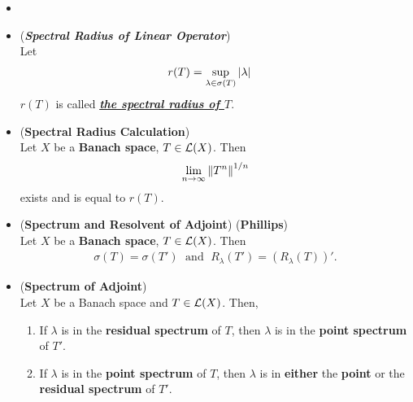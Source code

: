 \documentclass[11pt]{article}
\begin{document}
\begin{itemize}
\item 

\item \begin{definition} (\emph{\textbf{Spectral Radius of Linear Operator}})\\
Let 
\begin{align*}
r(T) &= \sup_{\lambda \in \sigma(T)} \left\lvert \lambda \right\rvert
\end{align*}
$r(T)$ is called  \underline{\textbf{\emph{the spectral radius of $T$}}}. 
\end{definition}

\item \begin{proposition} (\textbf{Spectral Radius Calculation}) \citep{reed1980methods}\\
Let $X$ be a \textbf{Banach space}, $T \in {\mathcal L}(X)$. Then 
\begin{align*}
\lim\limits_{n\rightarrow \infty}\left\|T^n\right\|_{}^{1/n}
\end{align*}
exists and is equal to $r(T)$. 
\end{proposition}

\item \begin{theorem} (\textbf{Spectrum and Resolvent of Adjoint}) (\textbf{Phillips}) \citep{reed1980methods}\\ 
Let $X$ be a \textbf{Banach space},  $T \in {\mathcal L}(X)$. Then 
\begin{align*}
\sigma(T) = \sigma(T')\; \text{ and }\; R_{\lambda}(T') = (R_{\lambda}(T))'.
\end{align*}
\end{theorem}

\item \begin{proposition}  (\textbf{Spectrum of Adjoint}) \citep{reed1980methods}\\ 
Let $X$ be a Banach space and $T \in {\mathcal L}(X)$. Then, 
\begin{enumerate}
\item If $\lambda$ is in the \textbf{residual spectrum} of $T$, then $\lambda$ is in the \textbf{point spectrum} of $T'$. 
\item If  $\lambda$ is in the \textbf{point spectrum} of $T$, then $\lambda$ is in \textbf{either} the \textbf{point} or the \textbf{residual spectrum} of $T'$. 
\end{enumerate}
\end{proposition}
\end{itemize}

\newpage


\end{document}
